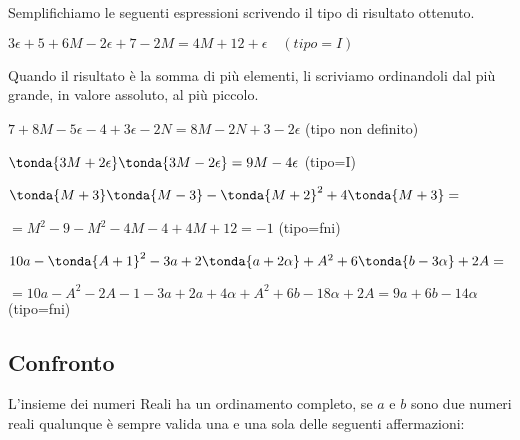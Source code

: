 \begin{exrig}
Semplifichiamo le seguenti espressioni scrivendo il tipo di risultato 
ottenuto.

 \begin{esempio}
  \(3\epsilon +5 +6M -2\epsilon +7 -2M = 4M +12 +\epsilon \quad (tipo=I)\)
 \end{esempio}

\begin{osservazione}
Quando il risultato è la somma di più elementi, li scriviamo ordinandoli 
dal più grande, in valore assoluto, al più piccolo.
\end{osservazione}

 \begin{esempio}
\(7 +8M -5\epsilon  -4 +3\epsilon-2N = 8M -2N +3 -2\epsilon\)
\quad (tipo non definito)
 \end{esempio}
 
 \begin{esempio}
\(\tonda{3M +2\epsilon} \tonda{3M -2\epsilon} = 9M -4\epsilon\)
\quad (tipo=I)
 \end{esempio}
 
 \begin{esempio}
\(\tonda{M +3} \tonda{M -3} - \tonda{M+2}^2 +4\tonda{M +3}=\)

\(=M^2 -9 -M^2 -4M -4 +4M +12 = -1\)
\quad (tipo=fni)
 \end{esempio}
 
 \begin{esempio}
\(10a -\tonda{A +1}^2 -3a +2\tonda{a+2\alpha} +A^2 +6\tonda{b -3\alpha} 
+2A= 
\)

\(=10a -A^2 -2A -1 -3a +2a+4\alpha +A^2 +6b -18\alpha +2A = 9a +6b 
-14\alpha\) 
\quad (tipo=fni)
 \end{esempio}
\end{exrig}


\subsection{Confronto}
\label{subsec:insnum_confronto}

L'insieme dei numeri Reali ha un ordinamento completo, se \(a\) e \(b\) sono 
due numeri reali qualunque è sempre valida una e una sola delle seguenti 
affermazioni:

